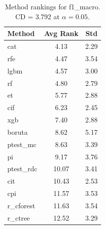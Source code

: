 \begin{table}[h]
\centering
\caption{Method rankings for f1_macro. CD = 3.792 at $\alpha=0.05$.}
\label{tab:ranks_f1_macro}
\begin{tabular}{lcc}
\toprule
Method & Avg Rank & Std \\
\midrule
cat & 4.13 & 2.29 \\
rfe & 4.47 & 3.54 \\
lgbm & 4.57 & 3.00 \\
rf & 4.80 & 2.79 \\
et & 5.77 & 2.88 \\
cif & 6.23 & 2.45 \\
xgb & 7.40 & 2.88 \\
boruta & 8.62 & 5.17 \\
ptest_mc & 8.63 & 3.39 \\
pi & 9.17 & 3.76 \\
ptest_rdc & 10.07 & 3.41 \\
cit & 10.43 & 2.53 \\
cpi & 11.57 & 3.53 \\
r_cforest & 11.63 & 3.54 \\
r_ctree & 12.52 & 3.29 \\
\bottomrule
\end{tabular}
\end{table}